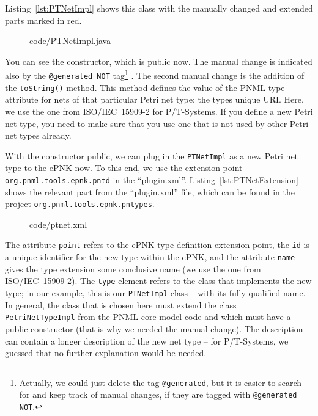Listing~\ref{lst:PTNetImpl} shows this class with the manually changed and
extended parts marked in red.
%
\begin{figure}[htbp!]
%
  {code/PTNetImpl.java}
\end{figure}
% 
You can see the constructor, which is public now. The manual change
is indicated also by the {\tt @generated NOT} tag\footnote
  {Actually, we could just delete the tag {\tt @generated}, but it is
   easier to search for and keep track of manual changes, if they are tagged
   with {\tt @generated NOT}.}%
. The second manual change is the addition of the {\tt toString()} method.
This method defines the value of the PNML type attribute for nets of that
particular Petri net type: the types unique URI. Here, we use the one from
ISO/IEC~15909-2 for P/T-Systems.
If you define a new Petri net type, you need to make sure that you use
one that is not used by other Petri net types already.

%
With the constructor public, we can plug in the {\tt PTNetImpl}
as a new Petri net type to the ePNK now. To this end, we use the extension point
{\tt org.pnml.tools.epnk.pntd} in the ``plugin.xml''.
Listing~\ref{lst:PTNetExtension} shows the relevant part from the
``plugin.xml'' file, which can be found in the project
{\tt org.pnml.tools.epnk.pntypes}.
%
\begin{figure}[htbp!]
%
  {code/ptnet.xml}
\end{figure}
%
The attribute {\tt point} refers to the ePNK type definition extension point,
the {\tt id} is a unique identifier for the new type within the ePNK, and the
attribute {\tt name} gives the type extension some conclusive name (we use the
one from ISO/IEC~15909-2).
The {\tt type} element refers to the class that implements the new type;
in our example, this is our {\tt PTNetImpl} class -- with its fully qualified
name. In general, the class that is chosen here must extend the class {\tt
PetriNetTypeImpl} from the PNML core model code and which must have a public
constructor (that is why we needed the manual change). The description can contain a longer
description of the new net type -- for P/T-Systems, we guessed that no further
explanation would be needed.

